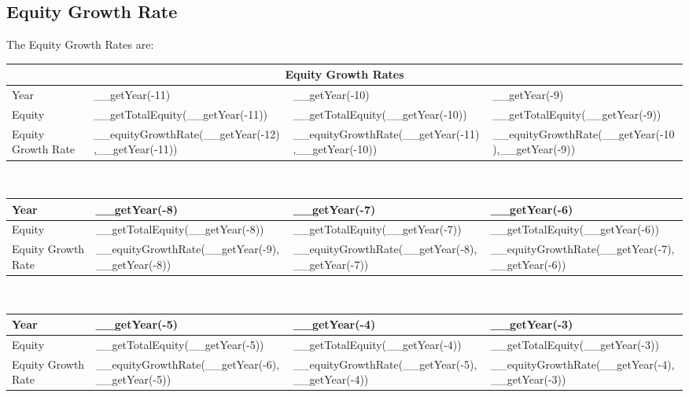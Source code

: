 \subsection{Equity Growth Rate}

The Equity Growth Rates are:\\

\begin{tabularx}{\textwidth}{|X|X|X|X|}
 \hline
 \multicolumn{4}{|c|}{Equity Growth Rates} \\
 \hline
 Year                                    & __getYear(-11)                                    & __getYear(-10)                                    & __getYear(-9)                                    \\
 \hline
 Equity                                  & __getTotalEquity(__getYear(-11))                  & __getTotalEquity(__getYear(-10))                  & __getTotalEquity(__getYear(-9))                  \\
 \rowcolor{lightgray} Equity Growth Rate & __equityGrowthRate(__getYear(-12),__getYear(-11)) & __equityGrowthRate(__getYear(-11),__getYear(-10)) & __equityGrowthRate(__getYear(-10),__getYear(-9)) \\
 \hline
\end{tabularx}\\

\begin{tabularx}{\textwidth}{|X|X|X|X|}
 \hline
 Year                                    & __getYear(-8)                                   & __getYear(-7)                                   & __getYear(-6)                                   \\
 \hline
 Equity                                  & __getTotalEquity(__getYear(-8))                 & __getTotalEquity(__getYear(-7))                 & __getTotalEquity(__getYear(-6))                 \\
 \rowcolor{lightgray} Equity Growth Rate & __equityGrowthRate(__getYear(-9),__getYear(-8)) & __equityGrowthRate(__getYear(-8),__getYear(-7)) & __equityGrowthRate(__getYear(-7),__getYear(-6)) \\
 \hline
\end{tabularx}\\

\begin{tabularx}{\textwidth}{|X|X|X|X|}
 \hline
 Year                                    & __getYear(-5)                                   & __getYear(-4)                                   & __getYear(-3)                                   \\
 \hline
 Equity                                  & __getTotalEquity(__getYear(-5))                 & __getTotalEquity(__getYear(-4))                 & __getTotalEquity(__getYear(-3))                 \\
 \rowcolor{lightgray} Equity Growth Rate & __equityGrowthRate(__getYear(-6),__getYear(-5)) & __equityGrowthRate(__getYear(-5),__getYear(-4)) & __equityGrowthRate(__getYear(-4),__getYear(-3)) \\
 \hline
\end{tabularx}\\

